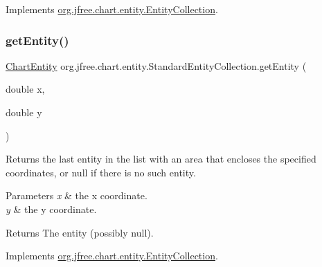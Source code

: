 Implements \mbox{\hyperlink{interfaceorg_1_1jfree_1_1chart_1_1entity_1_1_entity_collection_a9b449323f9e3a9b8aeb4f369b908ce10}{org.\+jfree.\+chart.\+entity.\+Entity\+Collection}}.

\mbox{\label{classorg_1_1jfree_1_1chart_1_1entity_1_1_standard_entity_collection_aa9af27932bd992d956e77272c8a15d06}} 
\subsubsection{\texorpdfstring{get\+Entity()}{getEntity()}\hspace{0.1cm}{\footnotesize\ttfamily [2/2]}}
{\footnotesize\ttfamily \mbox{\hyperlink{classorg_1_1jfree_1_1chart_1_1entity_1_1_chart_entity}{Chart\+Entity}} org.\+jfree.\+chart.\+entity.\+Standard\+Entity\+Collection.\+get\+Entity (\begin{DoxyParamCaption}\item[{double}]{x,  }\item[{double}]{y }\end{DoxyParamCaption})}

Returns the last entity in the list with an area that encloses the specified coordinates, or {\ttfamily null} if there is no such entity.


\begin{DoxyParams}{Parameters}
{\em x} & the x coordinate. \\
\hline
{\em y} & the y coordinate.\\
\hline
\end{DoxyParams}
\begin{DoxyReturn}{Returns}
The entity (possibly {\ttfamily null}). 
\end{DoxyReturn}


Implements \mbox{\hyperlink{interfaceorg_1_1jfree_1_1chart_1_1entity_1_1_entity_collection_a3bd10315f4cc926b0565e1fff221a1ec}{org.\+jfree.\+chart.\+entity.\+Entity\+Collection}}.

\mbox{\label{classorg_1_1jfree_1_1chart_1_1entity_1_1_standard_entity_collection_addd9f5935fb56802f93fd4ee2964b573}} 
